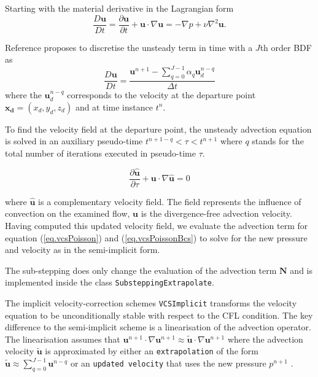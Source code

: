 Starting with the material derivative in the Lagrangian form
%
\begin{equation}
     \frac{D \mathbf{u}}{Dt} = \frac{\partial \mathbf{u}}{\partial t} + \mathbf{u} \cdot \nabla \mathbf{u} =
    -\nabla p + \nu \nabla^2 \mathbf{u}.
\end{equation}

Reference \cite{Karniadakis1991} proposes to discretise the unsteady term in time with a $J$th order BDF as
%
\begin{equation}
     \frac{D \mathbf{u}}{Dt} = \frac{ \mathbf{u}^{n+1} -  \sum_{q=0}^{J-1} \alpha_q \mathbf{u}_d^{n-q}}{\Delta t}
\end{equation}
%
where the $ \mathbf{u}_d^{n-q}$ corresponds to the velocity at the departure point $\mathbf{x_d}= (x_d, y_d, z_d)$ and at time instance $t^n$.

To find the velocity field at the departure point, the unsteady advection equation is solved in an auxiliary pseudo-time $t^{n+1-q} < \tau < t^{n+1}$ where $q$ stands for the total number of iterations executed in pseudo-time $\tau$.

\begin{equation}
   \frac{ \partial \hat{\mathbf{u}} } { \partial \tau } + \mathbf{u} \cdot \nabla \hat{\mathbf{u}} = 0
\end{equation}

where $ \hat{\mathbf{u}} $ is a complementary velocity field.
The field represents the influence of convection on the examined flow, $\mathbf{u}$ is the divergence-free advection velocity.
Having computed this updated velocity field, we evaluate the advection term for equation (\ref{eq.vcsPoisson}) and (\ref{eq.vcsPoissonBcs}) to solve for the new pressure and velocity as in the semi-implicit form.

The sub-stepping does only change the evaluation of the advection term $\mathbf{N}$ and is implemented inside the class \verb|SubsteppingExtrapolate|.


The implicit velocity-correction schemes \verb|VCSImplicit| transforms the velocity equation to be unconditionally stable with respect to the CFL condition.
The key difference to the semi-implicit scheme is a linearisation of the advection operator.
The linearisation assumes that $\mathbf{u}^{n+1} \cdot \nabla \mathbf{u}^{n+1} \approx \mathbf{\tilde{u}} \cdot \nabla \mathbf{u}^{n+1}$ where the advection velocity $\tilde{\mathbf{u}}$ is approximated by either an \verb|extrapolation| of the form $\mathbf{\tilde{u}} \approx \sum_{q=0}^{J-1} \mathbf{u}^{n-q}$ \cite{Simo1994} or an \verb|updated velocity| that uses the new pressure $p^{n+1}$ \cite{Dong2010}.


